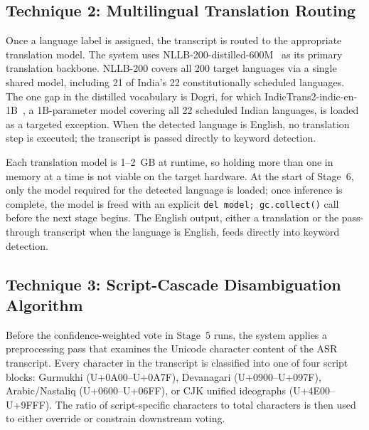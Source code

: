 \documentclass[conference]{IEEEtran}
\begin{document}
\subsection{Technique 2: Multilingual Translation Routing}

Once a language label is assigned, the transcript is routed to the appropriate translation model. The system uses NLLB-200-distilled-600M~\cite{costajussa2024nllb} as its primary translation backbone. NLLB-200 covers all 200 target languages via a single shared model, including 21 of India's 22 constitutionally scheduled languages. The one gap in the distilled vocabulary is Dogri, for which IndicTrans2-indic-en-1B~\cite{gala2023indictrans2}, a 1B-parameter model covering all 22 scheduled Indian languages, is loaded as a targeted exception. When the detected language is English, no translation step is executed; the transcript is passed directly to keyword detection.

Each translation model is 1--2~GB at runtime, so holding more than one in memory at a time is not viable on the target hardware. At the start of Stage~6, only the model required for the detected language is loaded; once inference is complete, the model is freed with an explicit \texttt{del model; gc.collect()} call before the next stage begins. The English output, either a translation or the pass-through transcript when the language is English, feeds directly into keyword detection.

\subsection{Technique 3: Script-Cascade Disambiguation Algorithm}

Before the confidence-weighted vote in Stage~5 runs, the system applies a preprocessing pass that examines the Unicode character content of the ASR transcript. Every character in the transcript is classified into one of four script blocks: Gurmukhi (U+0A00--U+0A7F), Devanagari (U+0900--U+097F), Arabic/Nastaliq (U+0600--U+06FF), or CJK unified ideographs (U+4E00--U+9FFF). The ratio of script-specific characters to total characters is then used to either override or constrain downstream voting.
\end{document}
